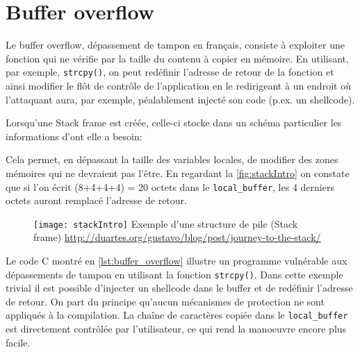 \section{Buffer overflow}

Le buffer overflow, dépassement de tampon en français, consiste à exploiter une fonction qui ne vérifie par la taille du contenu à copier en mémoire. En utilisant, par exemple, \texttt{strcpy()}, on peut redéfinir l'adresse de retour de la fonction et ainsi modifier le flôt de contrôle de l'application en le redirigeant à un endroit où l'attaquant aura, par exemple, péalablement injecté son code (p.ex. un shellcode).

Lorsqu'une \og Stack frame \fg est créée, celle-ci stocke dans un schéma particulier les informations d'ont elle a besoin:


Cela permet, en dépassant la taille des variables locales, de modifier des zones mémoires qui ne devraient pas l'être. En regardant la \autoref{fig:stackIntro} on constate que si l'on écrit (8+4+4+4) = 20 octets dans le \texttt{local_buffer}, les 4 derniers octets auront remplacé l'adresse de retour.

\begin{figure}[H]
	\centering
	\texttt{[image: stackIntro]}
	{Exemple d'une structure de pile (Stack frame)}
	{\url{http://duartes.org/gustavo/blog/post/journey-to-the-stack/}}
	\label{fig:stackIntro}
\end{figure}

Le code C montré en \autoref{lst:buffer_overflow} illustre un programme vulnérable aux dépassements de tampon en utilisant la fonction \texttt{strcpy()}. Dans cette exemple trivial il est possible d'injecter un shellcode dans le buffer et de redéfinir l'adresse de retour. On part du principe qu'aucun mécanismes de protection ne sont appliqués à la compilation. La chaîne de caractères copiée dans le \texttt{local_buffer} est directement contrôlée par l'utilisateur, ce qui rend la manoeuvre encore plus facile.

